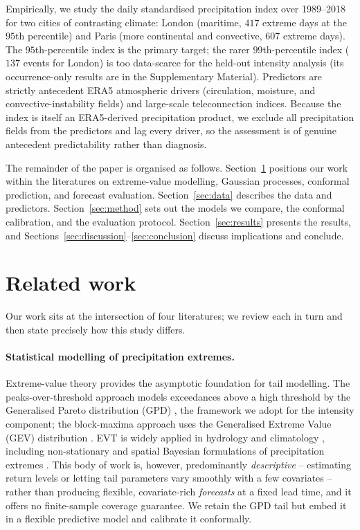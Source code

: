 \documentclass[11pt,a4paper]{article}
\begin{document}
Empirically, we study the daily standardised precipitation index over 1989--2018
for two cities of contrasting climate: London (maritime, $417$ extreme days at the
$95$th percentile) and Paris (more continental and convective, $607$ extreme
days). The $95$th-percentile index is the primary target; the rarer
$99$th-percentile index ($137$ events for London) is too data-scarce for the
held-out intensity analysis (its occurrence-only results are in the Supplementary
Material). Predictors are strictly antecedent ERA5 atmospheric drivers (circulation,
moisture, and convective-instability fields) and large-scale teleconnection
indices. Because the index is itself an ERA5-derived precipitation product, we
exclude all precipitation fields from the predictors and lag every driver, so the
assessment is of genuine antecedent predictability rather than diagnosis.

The remainder of the paper is organised as follows.
Section~\ref{sec:related} positions our work within the literatures on
extreme-value modelling, Gaussian processes, conformal prediction, and forecast
evaluation. Section~\ref{sec:data} describes the data and predictors.
Section~\ref{sec:method} sets out the models we compare, the conformal
calibration, and the evaluation protocol. Section~\ref{sec:results} presents the
results, and Sections~\ref{sec:discussion}--\ref{sec:conclusion} discuss
implications and conclude.

\section{Related work}\label{sec:related}

Our work sits at the intersection of four literatures; we review each in turn and
then state precisely how this study differs.

\paragraph{Statistical modelling of precipitation extremes.}
Extreme-value theory provides the asymptotic foundation for tail modelling. The
peaks-over-threshold approach models exceedances above a high threshold by the
Generalised Pareto distribution (GPD) \citep{pickands1975,davison1990}, the framework
we adopt for the intensity component; the block-maxima approach uses the
Generalised Extreme Value (GEV) distribution \citep{coles2001evt}. EVT is widely
applied in hydrology and climatology \citep{katz2002}, including non-stationary
and spatial Bayesian formulations of precipitation extremes
\citep{cooley2007}. This body of work is, however, predominantly
\emph{descriptive} -- estimating return levels or letting tail parameters vary
smoothly with a few covariates -- rather than producing flexible,
covariate-rich \emph{forecasts} at a fixed lead time, and it offers no
finite-sample coverage guarantee. We retain the GPD tail but embed it in a
flexible predictive model and calibrate it conformally.
\end{document}
